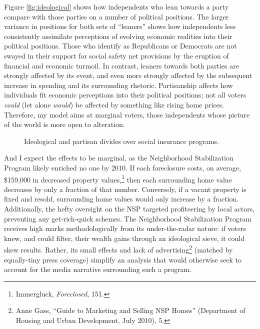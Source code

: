 \documentclass[12pt,oneside]{psthesis}
\begin{document}
Figure \ref{fig:ideological} shows how independents who lean towards a party compare with those parties on a number of political positions.
The larger variance in positions for both sets of ``leaners'' shows how independents less consistently assimilate perceptions of evolving economic realities into their political positions.
Those who identify as Republicans or Democrats are not swayed in their support for social safety net provisions by the eruption of financial and economic turmoil.
In contrast, leaners towards both parties are strongly affected by its event, and even more strongly affected by the subsequent increase in spending and its surrounding rhetoric.
Partisanship affects how individuals fit economic perceptions into their political positions; not all voters \emph{could} (let alone \emph{would}) be affected by something like rising home prices.
Therefore, my model aims at marginal voters, those independents whose picture of the world is more open to alteration.
\begin{figure}

{\centering {}

}

\caption{Ideological and partisan divides over social insurance programs.}\label{fig:ideological-social}
\end{figure}
And I expect the effects to be marginal, as the Neighborhood Stabilization Program likely enriched no one by 2010.
If each foreclosure costs, on average, \$159,000 in decreased property values,\footnote{Immergluck, \emph{Foreclosed}, 151.} then each surrounding home value decreases by only a fraction of that number.
Conversely, if a vacant property is fixed and resold, surrounding home values would only increase by a fraction.
Additionally, the hefty oversight on the NSP targeted profiteering by local actors, preventing any get-rich-quick schemes.
The Neighborhood Stabilization Program receives high marks methodologically from its under-the-radar nature: if voters knew, and could filter, their wealth gains through an ideological sieve, it could skew results.
Rather, its small effects and lack of advertising\footnote{Anne Gass, ``Guide to Marketing and Selling NSP Homes'' (Department of Housing and Urban Development, July 2010), 5.} (matched by equally-tiny press coverage) simplify an analysis that would otherwise seek to account for the media narrative surrounding such a program.
\end{document}
